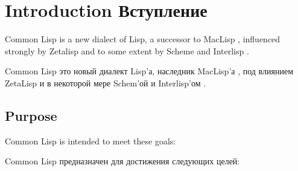 


\clearpage\def\pagestatus{FINAL PROOF}
\chapter{Introduction Вступление}

Common Lisp is a new dialect of Lisp, a
successor to MacLisp \cite{MOONUAL,PITMANUAL}, influenced strongly by
Zetalisp \cite{BLUE-LISPM,GREEN-LISPM} and to some extent by Scheme
\cite{SCHEME-REVISED-REPORT} and Interlisp \cite{INTERLISP}.

Common Lisp это новый диалект Lisp'а, наследник
MacLisp'а \cite{MOONUAL,PITMANUAL}, под влиянием
ZetaLisp \cite{BLUE-LISPM,GREEN-LISPM} и в некоторой мере
Schem'ой \cite{SCHEME-REVISED-REPORT} и Interlisp'ом \cite{INTERLISP}.

\section{Purpose}

Common Lisp is intended to meet these goals:

Common Lisp предназначен для достижения следующих целей:


